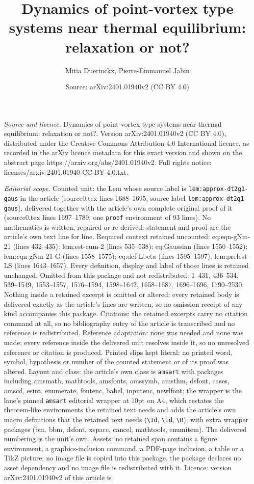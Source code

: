 \documentclass[10pt,a4paper]{amsart}
\title[Dynamics of point-vortex type systems near thermal equilibri]{Dynamics of point-vortex type systems near thermal equilibrium: relaxation or not?}
\author{Mitia Duerinckx, Pierre-Emmanuel Jabin}
\date{Source: arXiv:2401.01940v2 (CC BY 4.0)}
\begin{document}
\maketitle

\noindent\emph{Source and licence.} Dynamics of point-vortex type systems near thermal equilibrium: relaxation or not?. Version arXiv:2401.01940v2 (CC BY 4.0), distributed under the Creative Commons Attribution 4.0 International licence, as recorded in the arXiv licence metadata for this exact version and shown on the abstract page https://arxiv.org/abs/2401.01940v2. Full rights notice: licenses/arxiv-2401.01940-CC-BY-4.0.txt.\par\smallskip

\noindent\textit{Editorial scope.} Counted unit: the Lem whose source label is \texttt{lem:approx-dt2g1-gaus} in the article (source0.tex lines 1688--1695, source label \texttt{lem:approx-dt2g1-gaus}), delivered together with the article's own complete original proof of it (source0.tex lines 1697--1789, one \texttt{proof} environment of 93 lines). No mathematics is written, repaired or re-derived: statement and proof are the article's own text line for line. Required context retained uncounted: eq:eqn-gNm-21 (lines 432--435); lem:est-cum-2 (lines 535--538); eq:Gaussian (lines 1550--1552); lem:eqn-gNm-21-G (lines 1558--1575); eq:def-Lbeta (lines 1595--1597); lem:prelest-LS (lines 1643--1657). Every definition, display and label of those lines is retained unchanged. Omitted from this package and not redistributed: 1--431, 436--534, 539--1549, 1553--1557, 1576--1594, 1598--1642, 1658--1687, 1696--1696, 1790--2530. Nothing inside a retained excerpt is omitted or altered: every retained body is delivered exactly as the article's lines are written, so no omission receipt of any kind accompanies this package. Citations: the retained excerpts carry no citation command at all, so no bibliography entry of the article is transcribed and no reference is redistributed. Reference adaptation: none was needed and none was made; every reference inside the delivered unit resolves inside it, so no unresolved reference or citation is produced. Printed slips kept literal: no printed word, symbol, hypothesis or number of the counted statement or of its proof was altered. Layout and class: the article's own class is \texttt{amsart} with packages including amsmath, mathtools, amsfonts, amssymb, amsthm, dsfont, cases, amscd, esint, enumerate, fontenc, babel, inputenc, newlfont; the wrapper is the lane's pinned \texttt{amsart} editorial wrapper at 10pt on A4, which restates the theorem-like environments the retained text needs and adds the article's own macro definitions that the retained text needs (\texttt{\textbackslash Id}, \texttt{\textbackslash Ld}, \texttt{\textbackslash R}), with extra wrapper packages (bm, bbm, dsfont, xspace, cancel, mathtools, enumitem). The delivered numbering is the unit's own. Assets: no retained span contains a figure environment, a graphics-inclusion command, a PDF-page inclusion, a table or a TikZ picture; no image file is copied into this package, the package declares no asset dependency and no image file is redistributed with it. Licence: version arXiv:2401.01940v2 of this article is 
\end{document}
